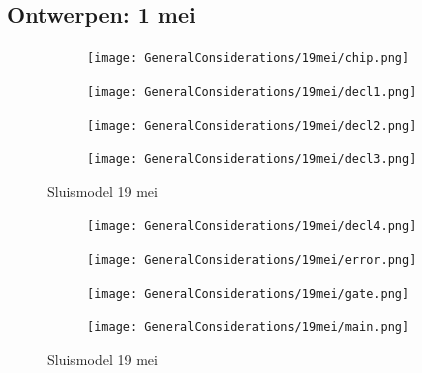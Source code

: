 \documentclass{article}
\begin{document}
	\subsection{Ontwerpen: 1 mei}
	\begin{figure}
		\centering
		\begin{subfigure}{0.45\linewidth}
			\texttt{[image: GeneralConsiderations/19mei/chip.png]}
			\caption{}
			\label{fig:1a}
		\end{subfigure}\hfill
		\begin{subfigure}{0.45\linewidth}
			\texttt{[image: GeneralConsiderations/19mei/decl1.png]}
			\caption{}
			\label{fig:1a}
		\end{subfigure}
		
		\begin{subfigure}{0.45\linewidth}
			\texttt{[image: GeneralConsiderations/19mei/decl2.png]}
			\caption{}
			\label{fig:1a}
		\end{subfigure}\hfill
		\begin{subfigure}{0.45\linewidth}
			\texttt{[image: GeneralConsiderations/19mei/decl3.png]}
			\caption{}
			\label{fig:1a}
		\end{subfigure}
		\caption{Sluismodel 19 mei}
		\label{fig:1}
	\end{figure}
	
	\begin{figure}
		\centering
		\begin{subfigure}{0.45\linewidth}
			\texttt{[image: GeneralConsiderations/19mei/decl4.png]}
			\caption{}
			\label{fig:1a}
		\end{subfigure}\hfill
		\begin{subfigure}{0.45\linewidth}
			\texttt{[image: GeneralConsiderations/19mei/error.png]}
			\caption{}
			\label{fig:1a}
		\end{subfigure}
		
		\begin{subfigure}{0.45\linewidth}
			\texttt{[image: GeneralConsiderations/19mei/gate.png]}
			\caption{}
			\label{fig:1a}
		\end{subfigure}\hfill
		\begin{subfigure}{0.45\linewidth}
			\texttt{[image: GeneralConsiderations/19mei/main.png]}
			\caption{}
			\label{fig:1a}
		\end{subfigure}
		\caption{Sluismodel 19 mei}
		\label{fig:1}
	\end{figure}
	
\end{document}
